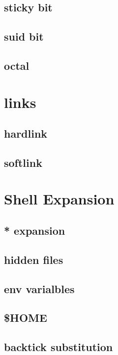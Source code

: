 \documentclass[hyperref={pdfpagelabels=false}]{beamer}
\begin{document}
\subsection{sticky bit}
\subsection{suid bit}
\subsection{octal}
\section{links}
\subsection{hardlink}
\subsection{softlink}
\section{Shell Expansion}
\subsection{* expansion}
\subsection{hidden files}
\subsection{env varialbles}
\subsection{\$HOME}
\subsection{backtick substitution}
\end{document}
